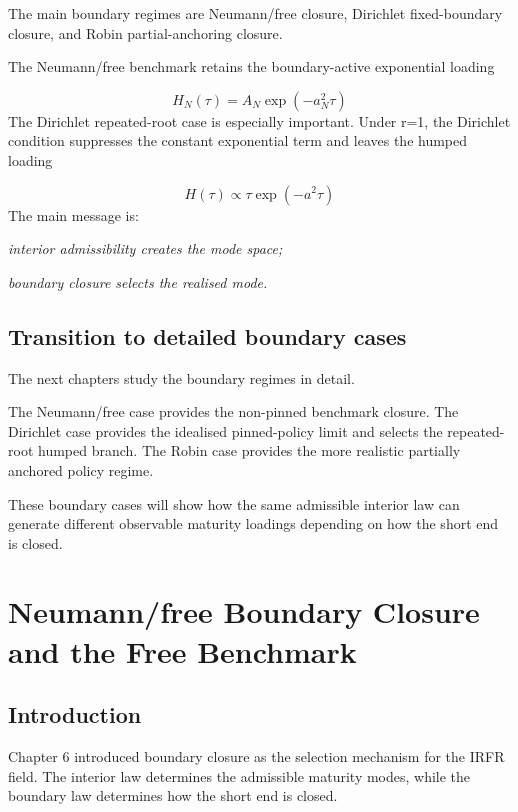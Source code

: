 \documentclass[11pt,oneside]{book}
\begin{document}
The main boundary regimes are Neumann/free closure, Dirichlet
fixed-boundary closure, and Robin partial-anchoring closure.

The Neumann/free benchmark retains the boundary-active exponential
loading

\[
H_N(\tau) = A_N \exp(-a_N^2\tau)
\]
The Dirichlet repeated-root case is especially important. Under r=1, the
Dirichlet condition suppresses the constant exponential term and leaves
the humped loading

\[
H(\tau) \propto \tau \exp(-a^2\tau)
\]
The main message is:

\begin{center}\emph{interior admissibility creates the mode space;}\end{center}
\begin{center}\emph{boundary closure selects the realised mode.}\end{center}
\section{Transition to detailed boundary cases}\label{transition-to-detailed-boundary-cases}

The next chapters study the boundary regimes in detail.

The Neumann/free case provides the non-pinned benchmark closure. The
Dirichlet case provides the idealised pinned-policy limit and selects
the repeated-root humped branch. The Robin case provides the more
realistic partially anchored policy regime.

These boundary cases will show how the same admissible interior law can
generate different observable maturity loadings depending on how the
short end is closed.

\chapter{Neumann/free Boundary Closure and the Free Benchmark}\label{chapter-7}

\section{Introduction}\label{introduction-4}

Chapter 6 introduced boundary closure as the selection mechanism for the
IRFR field. The interior law determines the admissible maturity modes,
while the boundary law determines how the short end is closed.
\end{document}
